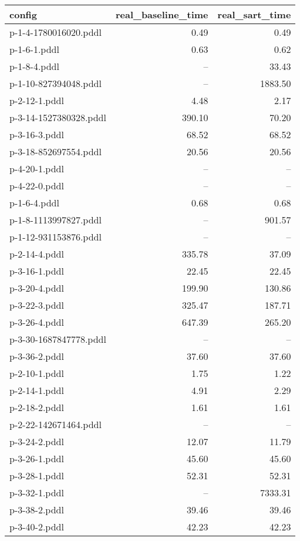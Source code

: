 \documentclass{article}
\begin{document}
                            \begin{center}
                            \scriptsize
                            \begin{tabular}{@{}l|r|r@{}}
                            config & real\_baseline\_time & real\_sart\_time\\\midrule
                             p-1-4-1780016020.pddl&0.49&0.49\\
 p-1-6-1.pddl&0.63&0.62\\
 p-1-8-4.pddl&--&33.43\\
 p-1-10-827394048.pddl&--&1883.50\\
 p-2-12-1.pddl&4.48&2.17\\
 p-3-14-1527380328.pddl&390.10&70.20\\
 p-3-16-3.pddl&68.52&68.52\\
 p-3-18-852697554.pddl&20.56&20.56\\
 p-4-20-1.pddl&--&--\\
 p-4-22-0.pddl&--&--\\
 p-1-6-4.pddl&0.68&0.68\\
 p-1-8-1113997827.pddl&--&901.57\\
 p-1-12-931153876.pddl&--&--\\
 p-2-14-4.pddl&335.78&37.09\\
 p-3-16-1.pddl&22.45&22.45\\
 p-3-20-4.pddl&199.90&130.86\\
 p-3-22-3.pddl&325.47&187.71\\
 p-3-26-4.pddl&647.39&265.20\\
 p-3-30-1687847778.pddl&--&--\\
 p-3-36-2.pddl&37.60&37.60\\
 p-2-10-1.pddl&1.75&1.22\\
 p-2-14-1.pddl&4.91&2.29\\
 p-2-18-2.pddl&1.61&1.61\\
 p-2-22-142671464.pddl&--&--\\
 p-3-24-2.pddl&12.07&11.79\\
 p-3-26-1.pddl&45.60&45.60\\
 p-3-28-1.pddl&52.31&52.31\\
 p-3-32-1.pddl&--&7333.31\\
 p-3-38-2.pddl&39.46&39.46\\
 p-3-40-2.pddl&42.23&42.23
                            \end{tabular}
                            \end{center}
                    
\end{document}
